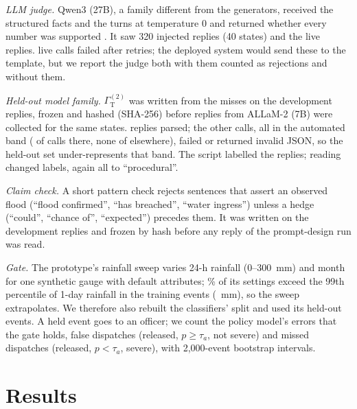 \documentclass[conference]{IEEEtran}
\begin{document}
\textit{LLM judge.} Qwen3 (27B), a family different from the generators, received the structured facts and the turns at temperature 0 and returned whether every number was supported \cite{Zheng2023}. It saw 320 injected replies (40 states) and the \LiveN{} live replies. \JudFailN{} live calls failed after retries; the deployed system would send these to the template, but we report the judge both with them counted as rejections and without them.

\textit{Held-out model family.} $\Gamma_{\mathrm{T}}^{(2)}$ was written from the misses on the development replies, frozen and hashed (SHA-256) before replies from ALLaM-2 (7B) were collected for the same \HoStates{} states. \HoN{} replies parsed; the other \HoParseFail{} calls, all in the automated band (\AllamFailAuto{} of \AllamAutoCalls{} calls there, none of \AllamOtherCalls{} elsewhere), failed or returned invalid JSON, so the held-out set under-represents that band. The script labelled the replies; reading changed \HoOverrides{} labels, again all to ``procedural''.

\textit{Claim check.} A short pattern check rejects sentences that assert an observed flood (``flood confirmed'', ``has breached'', ``water ingress'') unless a hedge (``could'', ``chance of'', ``expected'') precedes them. It was written on the development replies and frozen by hash before any reply of the prompt-design run was read.

\textit{Gate.} The prototype's rainfall sweep varies 24-h rainfall (0--300~mm) and month for one synthetic gauge with default attributes; \SweepAboveP\% of its settings exceed the 99th percentile of 1-day rainfall in the training events (\ClsTOneP~mm), so the sweep extrapolates. We therefore also rebuilt the classifiers' split and used its \CalTest{} held-out events. A held event goes to an officer; we count the policy model's errors that the gate holds, false dispatches (released, $p\ge\tau_a$, not severe) and missed dispatches (released, $p<\tau_a$, severe), with 2,000-event bootstrap intervals.

\section{Results}
\end{document}
